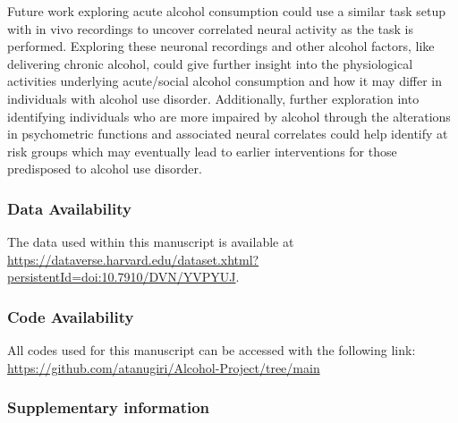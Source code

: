 \documentclass{article}
\begin{document}
\vspace{1em}

Future work exploring acute alcohol consumption could use a similar task setup with in vivo recordings to uncover correlated neural activity as the task is performed. Exploring these neuronal recordings and other alcohol factors, like delivering chronic alcohol, could give further insight into the physiological activities underlying acute/social alcohol consumption and how it may differ in individuals with alcohol use disorder. Additionally, further exploration into identifying individuals who are more impaired by alcohol through the alterations in psychometric functions and associated neural correlates could help identify at risk groups which may eventually lead to earlier interventions for those predisposed to alcohol use disorder.

\clearpage

\subsubsection{Data Availability}

The data used within this manuscript is available at \url{https://dataverse.harvard.edu/dataset.xhtml?persistentId=doi:10.7910/DVN/YVPYUJ}.

\subsubsection{Code Availability}
All codes used for this manuscript can be accessed with the following link:\\
\url{https://github.com/atanugiri/Alcohol-Project/tree/main}

\clearpage

\subsubsection{Supplementary information}

\clearpage
\end{document}
